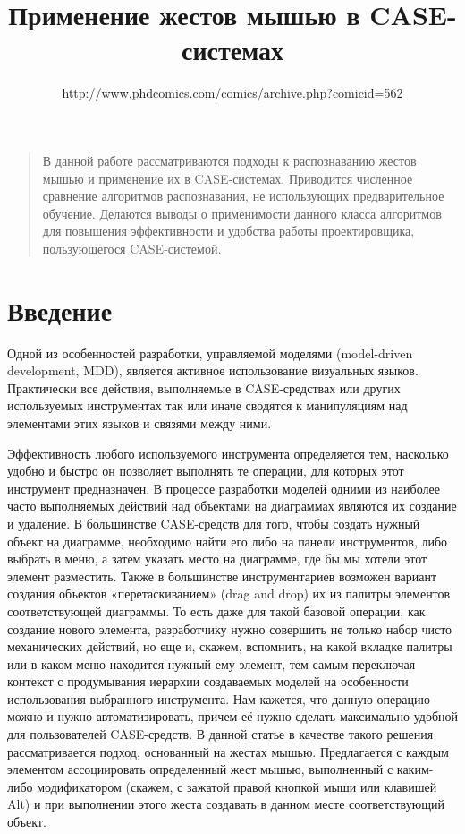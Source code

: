 \documentclass[a5paper]{article}
\title{Применение жестов мышью в CASE-системах}
\author{http://www.phdcomics.com/comics/archive.php?comicid=562}
\date{}
\begin{document}
\maketitle
\thispagestyle{empty}

\begin{quote}
\small\noindent
В данной работе рассматриваются подходы к распознаванию жестов мышью и применение их в CASE-системах. Приводится численное сравнение
алгоритмов распознавания, не использующих предварительное обучение. Делаются выводы о применимости данного класса алгоритмов
для повышения эффективности и удобства работы проектировщика, пользующегося CASE-системой.
\end{quote}

\section*{Введение}
Одной из особенностей разработки, управляемой моделями (model-driven development, MDD), является активное использование 
визуальных языков. Практически все действия, выполняемые в CASE-средствах или других используемых инструментах так или 
иначе сводятся к манипуляциям над элементами этих языков и связями между ними. 

Эффективность любого используемого инструмента определяется тем, насколько удобно и быстро он позволяет выполнять те операции, 
для которых этот инструмент предназначен. В процессе разработки моделей одними из наиболее часто выполняемых действий над объектами 
на диаграммах являются их создание и удаление.  В большинстве CASE-средств для того, чтобы создать нужный объект на диаграмме, 
необходимо найти его либо на панели инструментов, либо выбрать в меню, а затем указать место на диаграмме, где бы мы хотели этот 
элемент разместить. Также в большинстве инструментариев возможен вариант создания объектов «перетаскиванием» (drag and drop) их из 
палитры элементов соответствующей диаграммы. То есть даже для такой базовой операции, как создание нового элемента, разработчику нужно 
совершить не только набор чисто механических действий, но еще и, скажем, вспомнить, на какой вкладке палитры или в каком меню находится 
нужный ему элемент, тем самым переключая контекст с продумывания иерархии создаваемых моделей на особенности использования 
выбранного инструмента. Нам кажется, что данную операцию можно и нужно автоматизировать, причем её нужно сделать максимально удобной для 
пользователей CASE-средств. В данной статье в качестве такого решения рассматривается подход, основанный на жестах мышью. 
Предлагается с каждым элементом ассоциировать определенный жест мышью, выполненный с каким-либо модификатором (скажем, с зажатой 
правой кнопкой мыши или клавишей Alt) и при выполнении этого жеста создавать в данном месте соответствующий объект. 
\end{document}
